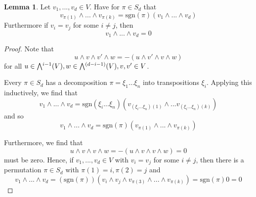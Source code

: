 \documentclass{scrartcl}
\newcommand{\sgn}{\mathrm{sgn}}
\newcommand{\extpow}{\mathchoice{{\textstyle\bigwedge}}
    {{\bigwedge}}
    {{\textstyle\wedge}}
    {{\scriptstyle\wedge}}}
\theoremstyle{definition}
\newtheorem{lemma}[definition]{Lemma}
\begin{document}
\begin{lemma}
    \label{prop:basic_properties_exterior_product}
    Let $v_1, ..., v_d \in V$. Have for $\pi \in S_d$ that
    \begin{equation*}
        v_{\pi(1)} \wedge ... \wedge v_{\pi(k)} = \sgn(\pi) (v_1 \wedge ... \wedge v_d)
    \end{equation*}
    Furthermore if $v_i = v_j$ for some $i \neq j$, then
    \begin{equation*}
        v_1 \wedge ... \wedge v_d = 0
    \end{equation*}
\end{lemma}
\begin{proof}
    Note that
    \begin{equation*}
        u \wedge v \wedge v' \wedge w = -(u \wedge v' \wedge v \wedge w)
    \end{equation*}
    for all $u \in \extpow^{i - 1}(V), w \in \extpow^{(d - i - 1)}(V), v, v' \in V$.

    Every $\pi \in S_d$ has a decomposition $\pi = \xi_1 ... \xi_n$ into transpositions $\xi_i$.
    Applying this inductively, we find that
    \begin{equation*}
        v_1 \wedge ... \wedge v_d = \sgn(\xi_i ... \xi_n) (v_{(\xi_i ... \xi_n)(1)} \wedge ... v_{(\xi_i ... \xi_n)(k)})
    \end{equation*}
    and so
    \begin{equation*}
        v_1 \wedge ... \wedge v_d = \sgn(\pi) (v_{\pi(1)} \wedge ... \wedge v_{\pi(k)})
    \end{equation*}

    Furthermore, we find that
    \begin{equation*}
        u \wedge v \wedge v \wedge w = -(u \wedge v \wedge v \wedge w) = 0
    \end{equation*}
    must be zero.
    Hence, if $v_1, ..., v_d \in V$ with $v_i = v_j$ for some $i \neq j$, then there is a permutation $\pi \in S_d$ with $\pi(1) = i, \pi(2) = j$ and
    \begin{equation*}
        v_1 \wedge ... \wedge v_d = (\sgn(\pi))(v_i \wedge v_j \wedge v_{\pi(3)} \wedge ... \wedge v_{\pi(k)}) = \sgn(\pi) 0 = 0
    \end{equation*}
\end{proof}
\end{document}
